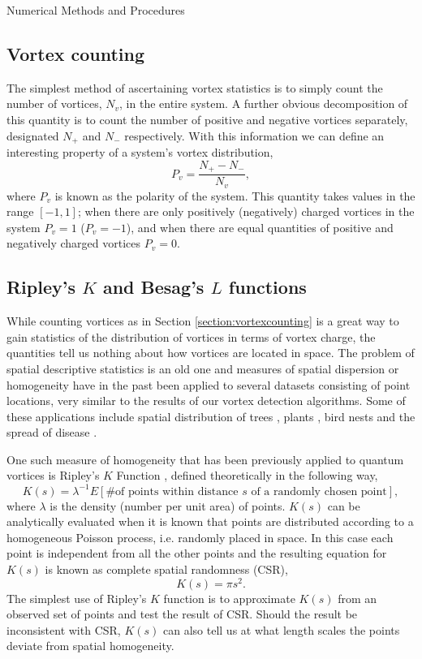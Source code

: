 \begin{chapter}{\label{cha:numerics}Numerical Methods and Procedures}
  \subsection{\label{section:vortexcounting} Vortex counting}
  The simplest method of ascertaining vortex statistics is to simply count the number of vortices, $N_v$, in the entire system. A further obvious decomposition of this quantity is to count the number of positive and negative vortices separately, designated $N_+$ and $N_-$ respectively. With this information we can define an interesting property of a system's vortex distribution,
  \begin{equation}
    P_v = \frac{N_+ - N_-}{N_v},
  \end{equation}
  where $P_v$ is known as the polarity of the system. This quantity takes values in the range $[-1,1]$; when there are only positively (negatively) charged vortices in the system $P_v=1$ ($P_v=-1$), and when there are equal quantities of positive and negatively charged vortices $P_v=0$.
  \subsection{\label{section:ripleysk} Ripley's $K$ and Besag's $L$ functions }
  While counting vortices as in Section \ref{section:vortexcounting} is a great way to gain statistics of the distribution of vortices in terms of vortex charge, the quantities tell us nothing about how vortices are located in space. The problem of spatial descriptive statistics is an old one and measures of spatial dispersion or homogeneity have in the past been applied to several datasets consisting of point locations, very similar to the results of our vortex detection algorithms. Some of these applications include spatial distribution of trees \cite{duncan_1993,peterson_1995,stoyan_2000}, plants \cite{stamp_1990}, bird nests \cite{gaines_2000} and the spread of disease \cite{diggle_1991}.


  One such measure of homogeneity that has been previously applied to quantum vortices \cite{bagg12} is Ripley's $K$ Function \cite{dixon_2002}, defined theoretically in the following way,
  \begin{equation}\label{eq:ripleysktheory}
    K(s) = \lambda^{-1}E[\text{\# of points within distance $s$ of a randomly chosen point}],
  \end{equation}
  where $\lambda$ is the density (number per unit area) of points. $K(s)$ can be analytically evaluated when it is known that points are distributed according to a homogeneous Poisson process, i.e. randomly placed in space. In this case each point is independent from all the other points and the resulting equation for $K(s)$ is known as complete spatial randomness (CSR),
  \begin{equation}\label{eq:ripleyskcsr}
    K(s) = \pi s^2.
  \end{equation}
  The simplest use of Ripley's $K$ function is to approximate $K(s)$ from an observed set of points and test the result of CSR. Should the result be inconsistent with CSR, $K(s)$ can also tell us at what length scales the points deviate from spatial homogeneity.


\end{chapter}
